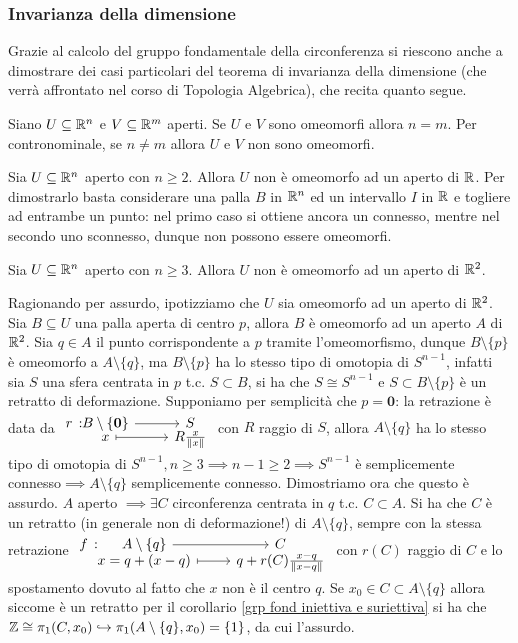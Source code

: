 \subsubsection{Invarianza della dimensione}
Grazie al calcolo del gruppo fondamentale della circonferenza si riescono anche a dimostrare dei casi particolari del teorema di invarianza della dimensione (che verrà affrontato nel corso di Topologia Algebrica), che recita quanto segue.
\begin{theorema}
	Siano $U\subseteq\mathbb{R}^n$ e $V\subseteq \mathbb{R}^m$ aperti. Se $U$ e $V$ sono omeomorfi allora $n=m$. Per contronominale, se $n\neq m$ allora $U$ e $V$ non sono omeomorfi.
\end{theorema}


\begin{observe}
	Sia $U\subseteq\mathbb{R}^n$ aperto con $n\geq 2$. Allora $U$ non è omeomorfo ad un aperto di $\mathbb{R}$. Per dimostrarlo basta considerare una palla $B$ in $\mathbb{R}^n$ ed un intervallo $I$ in $\mathbb{R}$ e togliere ad entrambe un punto: nel primo caso si ottiene ancora un connesso, mentre nel secondo uno sconnesso, dunque non possono essere omeomorfi.
\end{observe}
\begin{theorema}
	Sia $U\subseteq\mathbb{R}^n$ aperto con $n\geq 3$. Allora $U$ non è omeomorfo ad un aperto di $\mathbb{R}^2$.
\end{theorema}
\begin{demonstration}
	Ragionando per assurdo, ipotizziamo che $U$ sia omeomorfo ad un aperto di $\mathbb{R}^2$. Sia $B\subseteq U$ una palla aperta di centro $p$, allora $B$ è omeomorfo ad un aperto $A$ di $\mathbb{R}^2$. Sia $q\in A$ il punto corrispondente a $p$ tramite l'omeomorfismo, dunque $B\setminus\{p\}$ è omeomorfo a $A\setminus\{q\}$, ma $B\setminus\{p\}$ ha lo stesso tipo di omotopia di $S^{n-1}$, infatti sia $S$ una sfera centrata in $p$ t.c. $S\subset B$, si ha che $S\cong S^{n-1}$ e $S\subset B\setminus\{p\}$ è un retratto di deformazione. Supponiamo per semplicità che $p=\mathbf{0}$: la retrazione è data da $\displaystyle \funztot r {B\setminus \{\mathbf{0}\}} S x {R\frac{x}{\| x \|}}$ con $R$ raggio di $S$, allora $A\setminus \{q\}$ ha lo stesso tipo di omotopia di $S^{n-1}, n\geq 3\implies n-1\geq 2\implies S^{n-1}$ è semplicemente connesso$\implies A\setminus\{q\}$ semplicemente connesso. Dimostriamo ora che questo è assurdo.\newline
	$A$ aperto $\implies \exists C$ circonferenza centrata in $q$ t.c. $C\subset A$. Si ha che $C$ è un retratto (in generale non di deformazione!) di $A\setminus\{q\}$, sempre con la stessa retrazione $\displaystyle \funztot f {A\setminus\{q\}} C {x=q+(x-q)} {q+r(C)\frac{x-q}{\| x-q \|}}$ con $r(C)$ raggio di $C$ e lo spostamento dovuto al fatto che $x$ non è il centro $q$. Se $x_0\in C\subset A\setminus\{q\}$ allora siccome è un retratto per il corollario \ref{grp fond iniettiva e suriettiva} si ha che $\mathbb{Z}\cong \pi_1(C, x_0)\hookrightarrow \pi_1(A\setminus\{q\}, x_0)=\{1\}$, da cui l'assurdo.
\end{demonstration}
